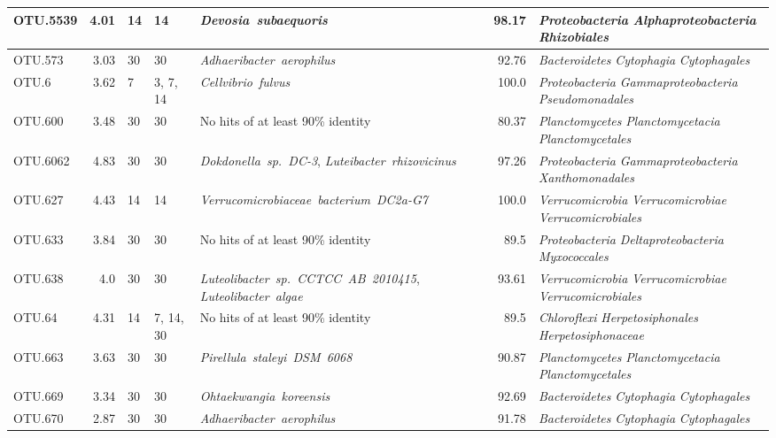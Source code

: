\begin{ThreePartTable}
\begin{longtable}{P{1.5cm}rP{1cm}P{1.5cm}P{4cm}rP{5cm}}
OTU.5539 & 4.01 & 14 & 14&\mbox{\textit{Devosia subaequoris}} & 98.17 & \mbox{\textit{Proteobacteria}} \mbox{\textit{Alphaproteobacteria}} \mbox{\textit{Rhizobiales}} \\ \midrule
OTU.573 & 3.03 & 30 & 30&\mbox{\textit{Adhaeribacter aerophilus}} & 92.76 & \mbox{\textit{Bacteroidetes}} \mbox{\textit{Cytophagia}} \mbox{\textit{Cytophagales}} \\ \midrule
OTU.6 & 3.62 & 7 & 3, 7, 14&\mbox{\textit{Cellvibrio fulvus}} & 100.0 & \mbox{\textit{Proteobacteria}} \mbox{\textit{Gammaproteobacteria}} \mbox{\textit{Pseudomonadales}} \\ \midrule
OTU.600 & 3.48 & 30 & 30&{No hits of at least 90\% identity} & 80.37 & \mbox{\textit{Planctomycetes}} \mbox{\textit{Planctomycetacia}} \mbox{\textit{Planctomycetales}} \\ \midrule
OTU.6062 & 4.83 & 30 & 30&\mbox{\textit{Dokdonella sp. DC-3}}, \mbox{\textit{Luteibacter rhizovicinus}} & 97.26 & \mbox{\textit{Proteobacteria}} \mbox{\textit{Gammaproteobacteria}} \mbox{\textit{Xanthomonadales}} \\ \midrule
OTU.627 & 4.43 & 14 & 14&\mbox{\textit{Verrucomicrobiaceae bacterium DC2a-G7}} & 100.0 & \mbox{\textit{Verrucomicrobia}} \mbox{\textit{Verrucomicrobiae}} \mbox{\textit{Verrucomicrobiales}} \\ \midrule
OTU.633 & 3.84 & 30 & 30&{No hits of at least 90\% identity} & 89.5 & \mbox{\textit{Proteobacteria}} \mbox{\textit{Deltaproteobacteria}} \mbox{\textit{Myxococcales}} \\ \midrule
OTU.638 & 4.0 & 30 & 30&\mbox{\textit{Luteolibacter sp. CCTCC AB 2010415}}, \mbox{\textit{Luteolibacter algae}} & 93.61 & \mbox{\textit{Verrucomicrobia}} \mbox{\textit{Verrucomicrobiae}} \mbox{\textit{Verrucomicrobiales}} \\ \midrule
OTU.64 & 4.31 & 14 & 7, 14, 30&{No hits of at least 90\% identity} & 89.5 & \mbox{\textit{Chloroflexi}} \mbox{\textit{Herpetosiphonales}} \mbox{\textit{Herpetosiphonaceae}} \\ \midrule
OTU.663 & 3.63 & 30 & 30&\mbox{\textit{Pirellula staleyi DSM 6068}} & 90.87 & \mbox{\textit{Planctomycetes}} \mbox{\textit{Planctomycetacia}} \mbox{\textit{Planctomycetales}} \\ \midrule
OTU.669 & 3.34 & 30 & 30&\mbox{\textit{Ohtaekwangia koreensis}} & 92.69 & \mbox{\textit{Bacteroidetes}} \mbox{\textit{Cytophagia}} \mbox{\textit{Cytophagales}} \\ \midrule
OTU.670 & 2.87 & 30 & 30&\mbox{\textit{Adhaeribacter aerophilus}} & 91.78 & \mbox{\textit{Bacteroidetes}} \mbox{\textit{Cytophagia}} \mbox{\textit{Cytophagales}} \\ \midrule

\end{longtable}
\end{ThreePartTable}
